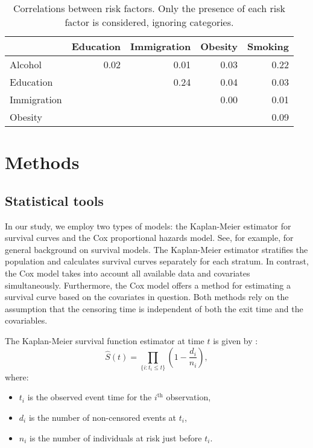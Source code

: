 \documentclass[risks,article,submit,moreauthors,pdftex]{Definitions/mdpi}
\begin{document}
\begin{table}\begin{longtable}{l|rrrr}
\caption{
\label{tab:fdr_cor}Correlations between risk factors.
        Only the presence of each risk factor is considered, ignoring
        categories.
} \\ 
\toprule
\multicolumn{1}{l}{} & Education & Immigration & Obesity & Smoking \\ 
\midrule
Alcohol & 0.02 & 0.01 & 0.03 & 0.22 \\ 
Education &  & 0.24 & 0.04 & 0.03 \\ 
Immigration &  &  & 0.00 & 0.01 \\ 
Obesity &  &  &  & 0.09 \\ 
\bottomrule
\end{longtable}
\end{table}

\hypertarget{methods}{%
\section{\texorpdfstring{Methods
\label{sec:stat_methods}}{Methods }}\label{methods}}

\hypertarget{statistical-tools}{%
\subsection{Statistical tools}\label{statistical-tools}}

In our study, we employ two types of models: the Kaplan-Meier estimator
for survival curves and the Cox proportional hazards model. See, for
example, \citet{klein_handbook_2016} for general background on survival
models. The Kaplan-Meier estimator stratifies the population and
calculates survival curves separately for each stratum. In contrast, the
Cox model takes into account all available data and covariates
simultaneously. Furthermore, the Cox model offers a method for
estimating a survival curve based on the covariates in question. Both
methods rely on the assumption that the censoring time is independent of
both the exit time and the covariables.

The Kaplan-Meier survival function estimator at time \(t\) is given by :
\begin{equation}
\hat{S}(t) = \prod_{\{i:t_i \leq t\}} \left(1 - \frac{d_i}{n_i}\right),
\end{equation} where:

\begin{itemize}
  \item $t_i$ is the observed event time for the $i^\text{th}$ observation,
  \item $d_i$ is the number of non-censored events at $t_i$,
  \item $n_i$ is the number of individuals at risk just before $t_i$.
\end{itemize}
\end{document}
